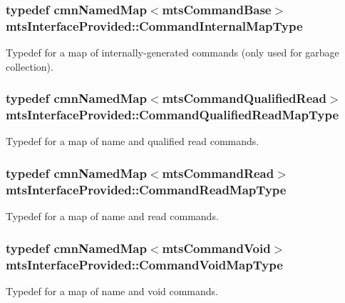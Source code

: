 \subsubsection[{Command\+Internal\+Map\+Type}]{\setlength{\rightskip}{0pt plus 5cm}typedef {\bf cmn\+Named\+Map}$<${\bf mts\+Command\+Base}$>$ {\bf mts\+Interface\+Provided\+::\+Command\+Internal\+Map\+Type}}\label{classmts_interface_provided_afbea756c205cd50db2a0884681ad650a}
Typedef for a map of internally-\/generated commands (only used for garbage collection). \hypertarget{classmts_interface_provided_a08e212add6d96324bf5e029d09349a04}{}
\subsubsection[{Command\+Qualified\+Read\+Map\+Type}]{\setlength{\rightskip}{0pt plus 5cm}typedef {\bf cmn\+Named\+Map}$<${\bf mts\+Command\+Qualified\+Read}$>$ {\bf mts\+Interface\+Provided\+::\+Command\+Qualified\+Read\+Map\+Type}}\label{classmts_interface_provided_a08e212add6d96324bf5e029d09349a04}
Typedef for a map of name and qualified read commands. \hypertarget{classmts_interface_provided_ab6a636c8cfda921a078ae1df8d90e087}{}
\subsubsection[{Command\+Read\+Map\+Type}]{\setlength{\rightskip}{0pt plus 5cm}typedef {\bf cmn\+Named\+Map}$<${\bf mts\+Command\+Read}$>$ {\bf mts\+Interface\+Provided\+::\+Command\+Read\+Map\+Type}}\label{classmts_interface_provided_ab6a636c8cfda921a078ae1df8d90e087}
Typedef for a map of name and read commands. \hypertarget{classmts_interface_provided_af8414fb168541e531244967e0cc1afd2}{}
\subsubsection[{Command\+Void\+Map\+Type}]{\setlength{\rightskip}{0pt plus 5cm}typedef {\bf cmn\+Named\+Map}$<${\bf mts\+Command\+Void}$>$ {\bf mts\+Interface\+Provided\+::\+Command\+Void\+Map\+Type}}\label{classmts_interface_provided_af8414fb168541e531244967e0cc1afd2}
Typedef for a map of name and void commands. \hypertarget{classmts_interface_provided_a963eeb4ba8e38411de4d40f983d5b4b3}{}
